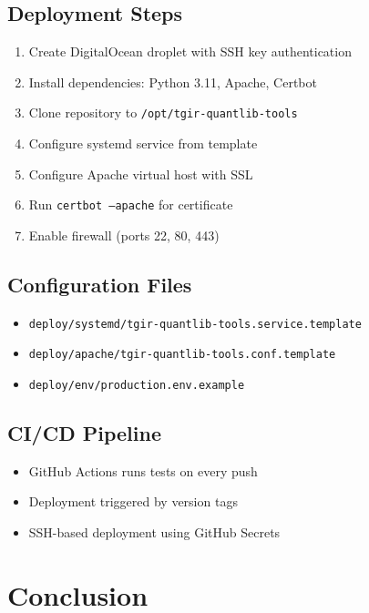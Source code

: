 \documentclass[10pt,a4paper]{article}
\begin{document}
\subsection{Deployment Steps}

\begin{enumerate}
    \item Create DigitalOcean droplet with SSH key authentication
    \item Install dependencies: Python 3.11, Apache, Certbot
    \item Clone repository to \texttt{/opt/tgir-quantlib-tools}
    \item Configure systemd service from template
    \item Configure Apache virtual host with SSL
    \item Run \texttt{certbot --apache} for certificate
    \item Enable firewall (ports 22, 80, 443)
\end{enumerate}

\subsection{Configuration Files}

\begin{itemize}
    \item \texttt{deploy/systemd/tgir-quantlib-tools.service.template}
    \item \texttt{deploy/apache/tgir-quantlib-tools.conf.template}
    \item \texttt{deploy/env/production.env.example}
\end{itemize}

\subsection{CI/CD Pipeline}

\begin{itemize}
    \item GitHub Actions runs tests on every push
    \item Deployment triggered by version tags
    \item SSH-based deployment using GitHub Secrets
\end{itemize}

\newpage

\section{Conclusion}
\end{document}

